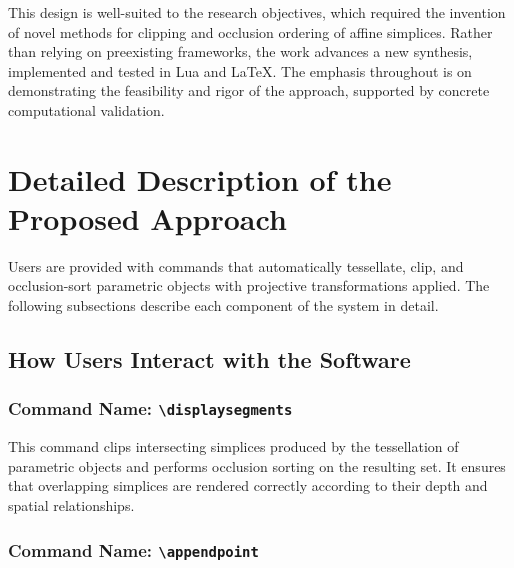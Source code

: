 This design is well-suited to the research objectives, which 
required the invention of novel methods for clipping and 
occlusion ordering of affine simplices. Rather than relying on 
preexisting frameworks, the work advances a new synthesis, 
implemented and tested in Lua and \LaTeX{}. The emphasis 
throughout is on demonstrating the feasibility and rigor of the 
approach, supported by concrete computational validation.

\section{Detailed Description of the Proposed Approach}
%

Users are provided with commands that automatically tessellate, 
clip, and occlusion-sort parametric objects with projective 
transformations applied. The following subsections describe each 
component of the system in detail.

\subsection{How Users Interact with the Software}

\subsubsection{Command Name: \texttt{\textbackslash displaysegments}}

This command clips intersecting simplices produced by the 
tessellation of parametric objects and performs occlusion 
sorting on the resulting set. It ensures that overlapping 
simplices are rendered correctly according to their depth 
and spatial relationships.

\subsubsection{Command Name: \texttt{\textbackslash appendpoint}}

